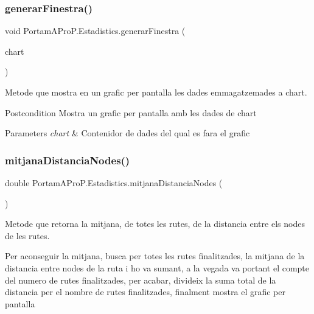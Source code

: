 \subsubsection{\texorpdfstring{generar\+Finestra()}{generarFinestra()}}
{\footnotesize\ttfamily void Portam\+A\+Pro\+P.\+Estadistics.\+generar\+Finestra (\begin{DoxyParamCaption}\item[{J\+Free\+Chart}]{chart }\end{DoxyParamCaption})}



Metode que mostra en un grafic per pantalla les dades emmagatzemades a chart. 

\begin{DoxyPostcond}{Postcondition}
Mostra un grafic per pantalla amb les dades de chart 
\end{DoxyPostcond}

\begin{DoxyParams}{Parameters}
{\em chart} & Contenidor de dades del qual es fara el grafic \\
\hline
\end{DoxyParams}
\mbox{\label{class_portam_a_pro_p_1_1_estadistics_a81b7957cb875a5e8ac80d2d94c330bde}} 
\subsubsection{\texorpdfstring{mitjana\+Distancia\+Nodes()}{mitjanaDistanciaNodes()}}
{\footnotesize\ttfamily double Portam\+A\+Pro\+P.\+Estadistics.\+mitjana\+Distancia\+Nodes (\begin{DoxyParamCaption}{ }\end{DoxyParamCaption})}



Metode que retorna la mitjana, de totes les rutes, de la distancia entre els nodes de les rutes. 

Per aconseguir la mitjana, busca per totes les rutes finalitzades, la mitjana de la distancia entre nodes de la ruta i ho va sumant, a la vegada va portant el compte del numero de rutes finalitzades, per acabar, divideix la suma total de la distancia per el nombre de rutes finalitzades, finalment mostra el grafic per pantalla

